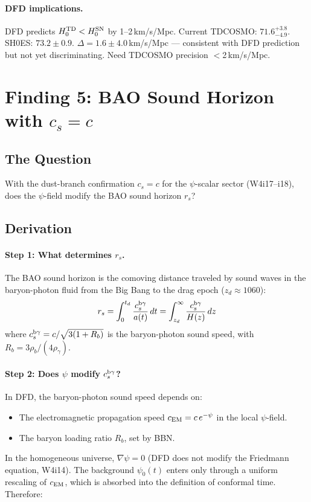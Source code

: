 \documentclass[11pt]{article}
\begin{document}
\paragraph{DFD implications.}
DFD predicts $H_0^{\rm TD} < H_0^{\rm SN}$ by 1--2\,km/s/Mpc. Current
TDCOSMO: $71.6^{+3.8}_{-4.9}$. SH0ES: $73.2 \pm 0.9$.
$\Delta = 1.6 \pm 4.0$\,km/s/Mpc --- consistent with DFD prediction
but not yet discriminating. Need TDCOSMO precision $<$2\,km/s/Mpc.

\section{Finding 5: BAO Sound Horizon with $c_s = c$}

\subsection{The Question}

With the dust-branch confirmation $c_s = c$ for the $\psi$-scalar sector
(W4i17--i18), does the $\psi$-field modify the BAO sound horizon $r_s$?

\subsection{Derivation}

\paragraph{Step 1: What determines $r_s$.}
The BAO sound horizon is the comoving distance traveled by sound waves
in the baryon-photon fluid from the Big Bang to the drag epoch ($z_d
\approx 1060$):
\begin{equation}
r_s = \int_0^{t_d} \frac{c_s^{\rm b\gamma}}{a(t)}\,dt
= \int_{z_d}^{\infty} \frac{c_s^{\rm b\gamma}}{H(z)}\,dz
\end{equation}
where $c_s^{\rm b\gamma} = c/\sqrt{3(1 + R_b)}$ is the baryon-photon
sound speed, with $R_b = 3\rho_b/(4\rho_\gamma)$.

\paragraph{Step 2: Does $\psi$ modify $c_s^{\rm b\gamma}$?}
In DFD, the baryon-photon sound speed depends on:
\begin{itemize}
\item The electromagnetic propagation speed $c_{\rm EM} = c\,e^{-\psi}$
  in the local $\psi$-field.
\item The baryon loading ratio $R_b$, set by BBN.
\end{itemize}
In the homogeneous universe, $\nabla\psi = 0$ (DFD does not modify the
Friedmann equation, W4i14). The background $\psi_0(t)$ enters only
through a uniform rescaling of $c_{\rm EM}$, which is absorbed into the
definition of conformal time. Therefore:
\end{document}
